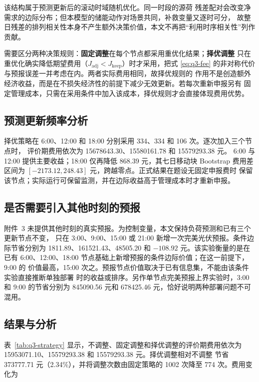 \documentclass[withoutpreface,bwprint]{cumcmthesis}
\begin{document}
该结构属于预测更新后的滚动时域随机优化\cite{parisio2014}。同一时段的源荷
残差配对会改变净需求的边际分布；但本模型的储能动作对场景共同，补救变量又逐时可分，
故整日残差的排列相关性本身不产生额外决策价值，本文不再把“利用时序相关性”列作贡献。

需要区分两种决策规则：\textbf{固定调整}在每个节点都采用重优化结果；\textbf{择优调整}
只在重优化确实降低期望费用（$J_{\mathrm{adj}}<J_{\mathrm{keep}}$）时才采用，把式
\eqref{eq:q3-fee} 的非对称代价与预报误差一并考虑在内。两者实际费用相同，故择优规则的
作用不是创造额外经济收益，而是在不损失经济性的前提下减少无效更新。若每次重新申报另有
固定管理成本，只需在采用条件中加入该成本，择优规则才会直接体现费用优势。

\subsection{预测更新频率分析}

择优策略在 6:00、12:00 和 18:00 分别采用 334、334 和 106 次。逐次加入三个节点时，
评价期费用依次为 \num{15678643.30}、\num{15580161.78} 和 \num{15579293.38} 元。
6:00 与 12:00 提供主要收益；18:00 仅再降低 \num{868.39} 元，其七日移动块 Bootstrap
费用差区间为 $[-\num{2173.12},\num{248.43}]$ 元，跨越零点。正式结果在题设无固定申报费时
保留该节点；实际运行可保留监测，并在边际收益高于管理成本时才重新申报。

\subsection{是否需要引入其他时刻的预报}

附件~3 未提供其他时刻的真实预报。为控制变量，本文保持负荷预测和已有三个更新节点不变，
只在 3:00、9:00、15:00 或 21:00 新增一次完美光伏预报。条件边际节省分别为
\num{1811.89}、\num{161521.43}、\num{48505.20} 和 $-\num{108.92}$ 元。该实验衡量的是在
已有 6:00、12:00、18:00 节点基础上新增预报的条件边际价值；在这一前提下，9:00 的
价值最高，15:00 次之。预报节点价值取决于已有信息集，不能由该条件实验直接推断单独部署
时的收益或排序。另作单节点完美预报上界实验时，3:00 和 9:00 的节省分别为
\num{845090.56} 元和 \num{678425.46} 元，恰好说明两种部署问题不可混用。

\subsection{结果与分析}

表~\ref{tab:q3-strategy} 显示，不调整、固定调整和择优调整的评价期费用依次为
\num{15953071.10}、\num{15579293.38} 和 \num{15579293.38} 元。择优调整相对不调整
节省 \num{373777.71} 元（2.34\%），并将调整次数由固定策略的 1002 次降至 774 次。费用变化为
\end{document}
